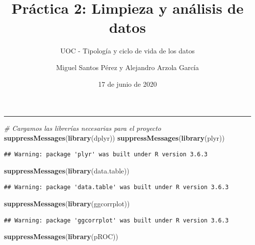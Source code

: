 \documentclass[
]{article}
\title{Práctica 2: Limpieza y análisis de datos}
\subtitle{UOC - Tipología y ciclo de vida de los datos}
\author{Miguel Santos Pérez y Alejandro Arzola García}
\date{17 de junio de 2020}
\newenvironment{Shaded}{\begin{snugshade}}{\end{snugshade}}
\newcommand{\CommentTok}[1]{\textcolor[rgb]{0.56,0.35,0.01}{\textit{#1}}}
\newcommand{\KeywordTok}[1]{\textcolor[rgb]{0.13,0.29,0.53}{\textbf{#1}}}
\newcommand{\NormalTok}[1]{#1}
\begin{document}
\maketitle

\renewcommand*\contentsname{Índice}
{
\setcounter{tocdepth}{2}
\tableofcontents
}
\newpage

\begin{center}\rule{0.5\linewidth}{0.5pt}\end{center}

\begin{Shaded}
\begin{Highlighting}[]
 \CommentTok{# Cargamos las librerías necesarias para el proyecto}
\KeywordTok{suppressMessages}\NormalTok{(}\KeywordTok{library}\NormalTok{(dplyr)) }
\KeywordTok{suppressMessages}\NormalTok{(}\KeywordTok{library}\NormalTok{(plyr))}
\end{Highlighting}
\end{Shaded}

\begin{verbatim}
## Warning: package 'plyr' was built under R version 3.6.3
\end{verbatim}

\begin{Shaded}
\begin{Highlighting}[]
\KeywordTok{suppressMessages}\NormalTok{(}\KeywordTok{library}\NormalTok{(data.table))}
\end{Highlighting}
\end{Shaded}

\begin{verbatim}
## Warning: package 'data.table' was built under R version 3.6.3
\end{verbatim}

\begin{Shaded}
\begin{Highlighting}[]
\KeywordTok{suppressMessages}\NormalTok{(}\KeywordTok{library}\NormalTok{(ggcorrplot))}
\end{Highlighting}
\end{Shaded}

\begin{verbatim}
## Warning: package 'ggcorrplot' was built under R version 3.6.3
\end{verbatim}

\begin{Shaded}
\begin{Highlighting}[]
\KeywordTok{suppressMessages}\NormalTok{(}\KeywordTok{library}\NormalTok{(pROC))}
\end{Highlighting}
\end{Shaded}
\end{document}
